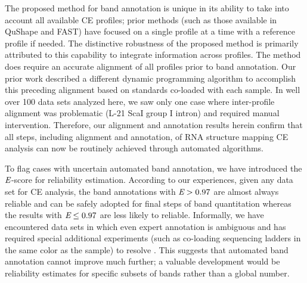 

The proposed method for band annotation is unique in its ability to take into account all available CE profiles; prior methods (such as those available in QuShape and FAST) have focused on a single profile at a time with a reference profile if needed. The distinctive robustness of the proposed method is primarily attributed to this capability to integrate information across profiles. The method does require an accurate alignment of all profiles prior to band annotation. Our prior work \citep{Yoon2011} described a different dynamic programming algorithm to accomplish this preceding alignment based on standards co-loaded with each sample. In well over 100 data sets analyzed here, we saw only one case where inter-profile alignment was problematic (L-21 ScaI group I intron) and required manual intervention. Therefore, our alignment and annotation results herein confirm that all steps, including alignment and annotation, of RNA structure mapping CE analysis can now be routinely achieved through automated algorithms.

To flag cases with uncertain automated band annotation, we have introduced the ${\emph{E}}$-score for reliability estimation. According to our experiences, given any data set for CE analysis, the band annotations with ${\emph{E}} > 0.97$ are almost always reliable and can be safely adopted for final steps of band quantitation whereas the results with ${\emph{E}} \le 0.97$ are less likely to reliable. Informally, we have encountered data sets in which even expert annotation is ambiguous and has required special additional experiments (such as co-loading sequencing ladders in the same color as the sample) to resolve \citep{tian2014nature}. This suggests that automated band annotation cannot improve much further; a valuable development would be reliability estimates for specific subsets of bands rather than a global number.

